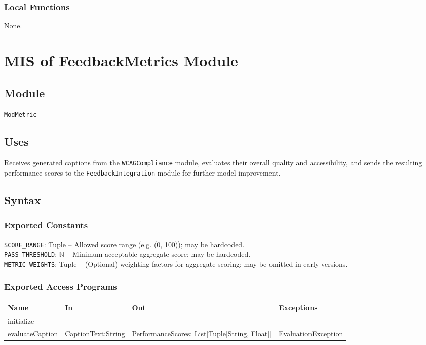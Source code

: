 \documentclass[12pt, titlepage]{article}
\begin{document}
\subsubsection{Local Functions}
None.

\section{MIS of FeedbackMetrics Module} \label{modmetric}

\subsection{Module}
\texttt{ModMetric}

\subsection{Uses}
Receives generated captions from the \texttt{WCAGCompliance} module, evaluates their 
overall quality and accessibility, and sends the resulting performance scores to the 
\texttt{FeedbackIntegration} module for further model improvement.

\subsection{Syntax}

\subsubsection{Exported Constants}
\texttt{SCORE\_RANGE}: Tuple -- Allowed score range (e.g. (0, 100)); may be hardcoded.\\
\texttt{PASS\_THRESHOLD}: $\mathbb{N}$ -- Minimum acceptable aggregate score; may be hardcoded.\\
\texttt{METRIC\_WEIGHTS}: Tuple -- (Optional) weighting factors for aggregate scoring; may be omitted in early versions.

\subsubsection{Exported Access Programs}
\begin{center}
  \begin{tabular}{p{3cm} p{3.5cm} p{4cm} p{4cm}}
    \hline
    \textbf{Name} & \textbf{In} & \textbf{Out} & \textbf{Exceptions} \\
    \hline
    initialize & - & - & - \\
    \hline
    evaluateCaption & CaptionText:String & PerformanceScores: List[Tuple[String, Float]]
 & EvaluationException \\
    \hline
  \end{tabular}
\end{center}
\end{document}
